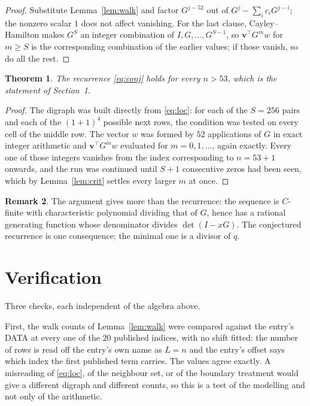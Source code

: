 \documentclass[11pt,a4paper]{article}
\theoremstyle{plain}
\newtheorem{theorem}{Theorem}
\theoremstyle{definition}
\newtheorem{remark}[theorem]{Remark}
\begin{document}
\begin{proof}
Substitute Lemma~\ref{lem:walk} and factor $G^{j-52}$ out of
$G^{j}-\sum_ic_iG^{j-i}$; the nonzero scalar $1$ does not affect
vanishing. For the last clause, Cayley--Hamilton makes $G^{S}$ an integer combination of
$I,G,\dots,G^{S-1}$, so $\mathbf{v}^{\!\top}G^{m}w$ for $m\ge S$ is the corresponding
combination of the earlier values; if those vanish, so do all the rest.
\end{proof}

\begin{theorem}
The recurrence \eqref{eq:conj} holds for every $n>53$, which is the statement of
Section~1.
\end{theorem}

\begin{proof}
The digraph was built directly from \eqref{eq:loc}: for each of the $S=256$ pairs and each
of the $(1+1)^{4}$ possible next rows, the condition was tested on every cell of
the middle row. The vector $w$ was formed by $52$ applications of $G$ in exact integer
arithmetic and $\mathbf{v}^{\!\top}G^{m}w$ evaluated for $m=0,1,\dots$, again exactly.
Every one of those integers vanishes from the index corresponding to $n=53+1$ onwards,
and the run was continued until $S+1$ consecutive zeros had been seen, which by
Lemma~\ref{lem:crit} settles every larger $m$ at once.
\end{proof}

\begin{remark}
The argument gives more than the recurrence: the sequence is $C$-finite with characteristic
polynomial dividing that of $G$, hence has a rational generating function whose denominator
divides $\det(I-xG)$. The conjectured recurrence is one consequence; the minimal one is a
divisor of $q$.
\end{remark}

\section{Verification}

Three checks, each independent of the algebra above.

First, the walk counts of Lemma~\ref{lem:walk} were compared against the entry's DATA at
every one of the $20$ published indices, with no shift fitted: the number of rows is
read off the entry's own name as $L=n$ and the entry's offset says which index the first
published term carries. The values agree exactly. A misreading of \eqref{eq:loc}, of the
neighbour set, or of the boundary treatment would give a different digraph and different
counts, so this is a test of the modelling and not only of the arithmetic.
\end{document}
